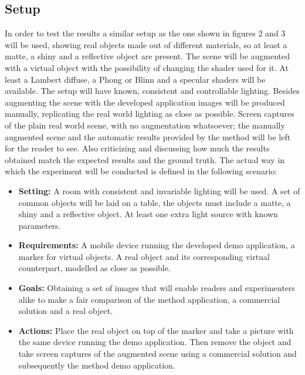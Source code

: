 \subsection{Setup}
In order to test the results a similar setup as the one shown in figures 2 and 3 will be used, showing real objects made out of different materials, so at least a matte, a shiny and a reflective object are present. The scene will be augmented with a virtual object with the possibility of changing the shader used for it. At least a Lambert diffuse, a Phong or Blinn and a specular shaders will be available. The setup will have known,  consistent and controllable lighting.\newline
Besides augmenting the scene with the developed application images will be produced manually, replicating the real world lighting as close as possible. Screen captures of the plain real world scene, with no augmentation whatsoever; the manually augmented scene and the automatic results provided by the method will be left for the reader to see. Also criticizing and discussing how much the results obtained match the expected results and the ground truth.\newline
The actual way in which the experiment will be conducted is defined in the following scenario:
\begin{itemize}
    \item \textbf{Setting:} A room with consistent and invariable lighting will be used. A set of common objects will be laid on a table, the objects must include a matte, a shiny and a reflective object. At least one extra light source with known parameters.
    \item \textbf{Requirements:} A mobile device running the developed demo application, a marker for virtual objects. A real object and its corresponding virtual counterpart, modelled as close as possible. 
    \item \textbf{Goals:} Obtaining a set of images that will enable readers and experimenters alike to make a fair comparison of the method application, a commercial solution and a real object.
    \item \textbf{Actions:} Place the real object on top of the marker and take a picture with the same device running the demo application. Then remove the object and take screen captures of the augmented scene using a commercial solution and subsequently the method demo application.
\end{itemize}

